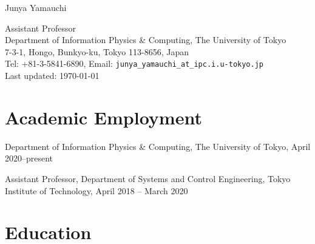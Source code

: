 \documentclass[letterpaper]{article}
\def\name{Junya Yamauchi}
\renewenvironment{itemize}{
  \begin{list}{}{
    \setlength{\leftmargin}{1.5em}
  }
}{
  \end{list}
}
\begin{document}
{\huge \name}


\vspace{0.25in}

Assistant Professor \\
Department of Information Physics \& Computing, The University of Tokyo \\
7-3-1, Hongo, Bunkyo-ku, Tokyo 113-8656, Japan \\
Tel: +81-3-5841-6890, Email: {\tt junya\_yamauchi\verb|_at_|ipc.i.u-tokyo.jp} \\
Last updated: \today


\section*{Academic Employment}

\begin{itemize}
  \item Department of Information Physics \& Computing, The University of Tokyo, April 2020–present
  \item Assistant Professor, Department of Systems and Control Engineering, Tokyo Institute of Technology, April 2018 – March 2020
\end{itemize}


\section*{Education}
\end{document}
